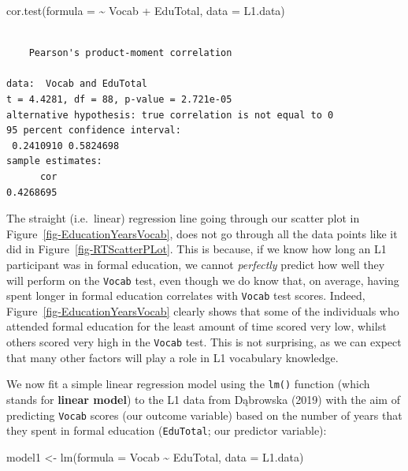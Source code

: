 \documentclass[
  letterpaper,
  DIV=11,
  numbers=noendperiod]{scrreprt}
\newenvironment{Shaded}{\begin{snugshade}}{\end{snugshade}}
\newcommand{\AttributeTok}[1]{\textcolor[rgb]{0.40,0.45,0.13}{#1}}
\newcommand{\FunctionTok}[1]{\textcolor[rgb]{0.28,0.35,0.67}{#1}}
\newcommand{\NormalTok}[1]{\textcolor[rgb]{0.00,0.23,0.31}{#1}}
\newcommand{\OtherTok}[1]{\textcolor[rgb]{0.00,0.23,0.31}{#1}}
\newcommand{\SpecialCharTok}[1]{\textcolor[rgb]{0.37,0.37,0.37}{#1}}
\begin{document}
\begin{Shaded}
\begin{Highlighting}[]
\FunctionTok{cor.test}\NormalTok{(}\AttributeTok{formula =} \SpecialCharTok{\textasciitilde{}}\NormalTok{ Vocab }\SpecialCharTok{+}\NormalTok{ EduTotal,}
         \AttributeTok{data =}\NormalTok{ L1.data)}
\end{Highlighting}
\end{Shaded}

\begin{verbatim}

    Pearson's product-moment correlation

data:  Vocab and EduTotal
t = 4.4281, df = 88, p-value = 2.721e-05
alternative hypothesis: true correlation is not equal to 0
95 percent confidence interval:
 0.2410910 0.5824698
sample estimates:
      cor 
0.4268695 
\end{verbatim}

The straight (i.e.~linear) regression line going through our scatter
plot in Figure~\ref{fig-EducationYearsVocab}, does not go through all
the data points like it did in Figure~\ref{fig-RTScatterPLot}. This is
because, if we know how long an L1 participant was in formal education,
we cannot \emph{perfectly} predict how well they will perform on the
\texttt{Vocab} test, even though we do know that, on average, having
spent longer in formal education correlates with \texttt{Vocab} test
scores. Indeed, Figure~\ref{fig-EducationYearsVocab} clearly shows that
some of the individuals who attended formal education for the least
amount of time scored very low, whilst others scored very high in the
\texttt{Vocab} test. This is not surprising, as we can expect that many
other factors will play a role in L1 vocabulary knowledge.

We now fit a simple linear regression model using the \texttt{lm()}
function (which stands for \textbf{linear model}) to the L1 data from
Dąbrowska (2019) with the aim of predicting \texttt{Vocab} scores (our
outcome variable) based on the number of years that they spent in formal
education (\texttt{EduTotal}; our predictor variable):

\begin{Shaded}
\begin{Highlighting}[]
\NormalTok{model1 }\OtherTok{\textless{}{-}} \FunctionTok{lm}\NormalTok{(}\AttributeTok{formula =}\NormalTok{ Vocab }\SpecialCharTok{\textasciitilde{}}\NormalTok{ EduTotal,}
             \AttributeTok{data =}\NormalTok{ L1.data)}
\end{Highlighting}
\end{Shaded}
\end{document}

